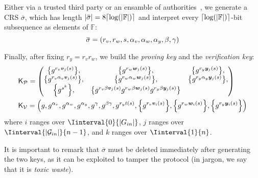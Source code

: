 Either via a trusted third party or an ensamble of authorities~\cite{GrothO2006}, we generate 
a CRS \(\overbar{\sigma}\), which has length 
\(\abs{\overbar{\sigma}} = 8\Ceil*{\call{\log}{\abs{\mathbb{F}}}}\) and interpret every 
\(\Ceil*{\call{\log}{\abs{\mathbb{F}}}}\)-bit subsequence as elements of \(\mathbb{F}\): 
\[\overbar{\sigma} = \Tuple{r_v, r_w, s, \alpha_v, \alpha_w, \alpha_y, \beta, \gamma}\]

Finally, after fixing \(r_y = r_{v}r_{w}\), we build the \emph{proving key} and the 
\emph{verification key}:
\begin{align*}
  & \ProverKey = 
  \begin{pmatrix*}
    \Set{g^{r_{v}\call{\bm{v}_j}{s}}}, &
    \Set{g^{r_{w}\call{\bm{w}_j}{s}}}, &
    \Set{g^{r_{y}\call{\bm{y}_j}{s}}}, \\
    \Set{g^{r_{v}\alpha_v\call{\bm{v}_j}{s}}}, &
    \Set{g^{r_{w}\alpha_w\call{\bm{w}_j}{s}}}, &
    \Set{g^{r_{y}\alpha_y\call{\bm{y}_j}{s}}}, \\
    \Set{g^{s^k}}, &
    \Set{g^{r_{v}{\beta}\call{\bm{v}_j}{s}}g^{r_{w}{\beta}\call{\bm{w}_j}{s}}g^{r_{y}{\beta}\call{\bm{y}_j}{s}}}
  \end{pmatrix*} \\
  & \VerifierKey = \Tuple{
    g, 
    g^{\alpha_v}, 
    g^{\alpha_w}, 
    g^{\alpha_y}, 
    g^{\gamma}, 
    g^{\beta\gamma}, 
    g^{r_{y}\call{t}{s}},
    \Set{g^{r_{v}\call{\bm{v}_i}{s}}}, 
    \Set{g^{r_{w}\call{\bm{w}_i}{s}}}, 
    \Set{g^{r_{y}\call{\bm{y}_i}{s}}}
  }
\end{align*}
where \(i\) ranges over \(\Iinterval{0}{\abs{G_{in}}}\), \(j\) ranges over 
\(\Iinterval{\abs{\mathcal{G}_{in}}}{n-1}\), and \(k\) ranges over \(\Iinterval{1}{n}\).

It is important to remark that \(\overbar{\sigma}\) must be deleted immediately after generating 
the two keys, as it can be exploited to tamper the protocol 
(in jargon, we say that it is \emph{toxic waste}).

